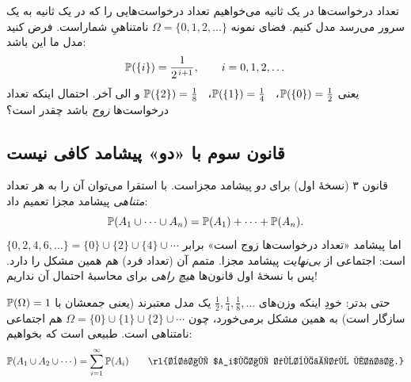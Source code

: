 \begin{example}[label=ex:server]{تعداد درخواست‌ها در یک ثانیه}
می‌خواهیم تعداد درخواست‌هایی را که در یک ثانیه به یک سرور می‌رسد مدل کنیم. فضای نمونه $\Omega=\{0,1,2,\dots\}$ نامتناهیِ شماراست. فرض کنید مدل ما این باشد:
\[ \P(\{i\})=\frac{1}{2^{\,i+1}},\qquad i=0,1,2,\dots \]
یعنی $\P(\{0\})=\tfrac12$، \ $\P(\{1\})=\tfrac14$، \ $\P(\{2\})=\tfrac18$ و الی آخر. احتمال اینکه تعداد درخواست‌ها \emph{زوج} باشد چقدر است؟
\end{example}

\begin{figblock}

\end{figblock}

\subsection{قانون سوم با «دو» پیشامد کافی نیست}

قانون ۳ (نسخهٔ اول) برای \emph{دو} پیشامد مجزاست. با استقرا می‌توان آن را به هر تعداد \emph{متناهی} پیشامد مجزا تعمیم داد:
\[ \P(A_1\cup\cdots\cup A_n)=\P(A_1)+\cdots+\P(A_n). \]
اما پیشامد «تعداد درخواست‌ها زوج است» برابر $\{0,2,4,6,\dots\}=\{0\}\cup\{2\}\cup\{4\}\cup\cdots$ است: اجتماعی از \emph{بی‌نهایت} پیشامد مجزا. متمم آن (تعداد فرد) هم همین مشکل را دارد. پس با نسخهٔ اول قانون‌ها \emph{هیچ راهی} برای محاسبهٔ احتمال آن نداریم!

حتی بدتر: خودِ اینکه وزن‌های $\tfrac12,\tfrac14,\tfrac18,\dots$ یک مدل معتبرند (یعنی جمعشان با $\P(\Omega)=1$ سازگار است) به همین مشکل برمی‌خورد، چون $\Omega=\{0\}\cup\{1\}\cup\{2\}\cup\cdots$ هم اجتماعی نامتناهی است. طبیعی است که بخواهیم:
\[ \P(A_1\cup A_2\cup\cdots)=\sum_{i=1}^\infty\P(A_i)\qquad\text{\rl{برای $A_i$های دوبه‌دو مجزا.}} \]

